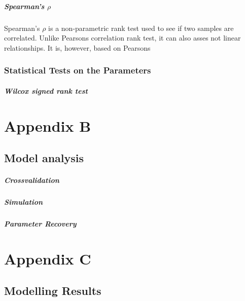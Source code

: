 \paragraph{Spearman's $\rho$}
Spearman's $\rho$ is a non-parametric rank test used to see if two samples are correlated. Unlike Pearsons correlation rank test, it can also asses not linear relationships. It is, however, based on Pearsons 
\subsection*{Statistical Tests on the Parameters}
\paragraph{Wilcox signed rank test}

\chapter*{Appendix B}
\section*{Model analysis}
\paragraph{Crossvalidation}
\paragraph{Simulation}
\paragraph{Parameter Recovery}

\chapter*{Appendix C}
\section*{Modelling Results}
